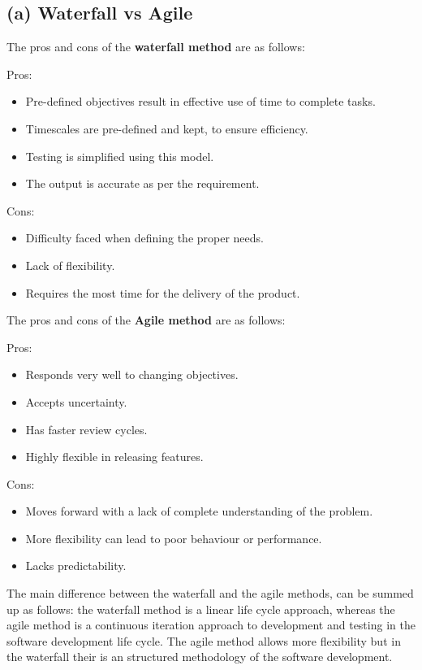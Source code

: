 \documentclass{article}
\begin{document}
\subsection{(a) Waterfall vs Agile}
\begin{flushleft}The pros and cons of the \textbf{waterfall method} are as follows:\end{flushleft}
\begin{flushleft}
	Pros:
\end{flushleft}
\begin{itemize}
	\item Pre-defined objectives result in effective use of time to complete tasks.
	\item Timescales are pre-defined and kept, to ensure efficiency.
	\item Testing is simplified using this model.
	\item The output is accurate as per the requirement.
\end{itemize}
Cons:
\begin{itemize}
	\item Difficulty faced when defining the proper needs.
	\item Lack of flexibility.
	\item Requires the most time for the delivery of the product.
	\newline
\end{itemize}
\begin{flushleft}
	The pros and cons of the \textbf{Agile method} are as follows:
\end{flushleft}
\begin{flushleft}
	Pros:
\end{flushleft}
\begin{itemize}
	\item Responds very well to changing objectives.
	\item Accepts uncertainty.
	\item Has faster review cycles.
	\item Highly flexible in releasing features.	
\end{itemize}
Cons:
\begin{itemize}
	\item Moves forward with a lack of complete understanding of the problem.
	\item More flexibility can lead to poor behaviour or performance.
	\item Lacks predictability.
\end{itemize}
\begin{flushleft}
	The main difference between the waterfall and the agile methods, can be summed up as follows: the waterfall method is a linear life cycle approach, whereas the agile method is a continuous iteration approach to development and testing in the software development life cycle. The agile method allows more flexibility but in the waterfall their is an structured methodology of the software development.
\end{flushleft}
\end{document}
